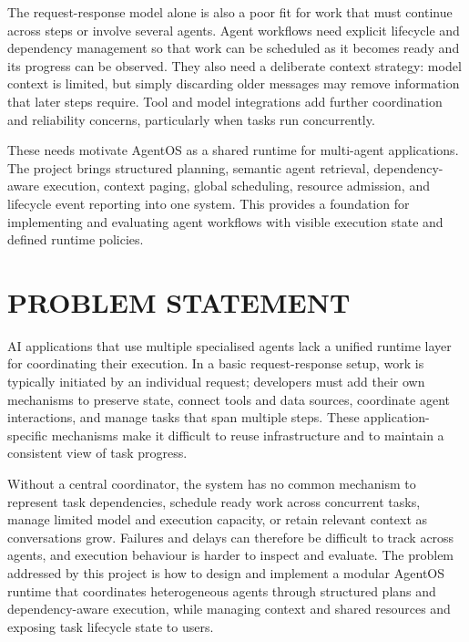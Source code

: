 The request-response model alone is also a poor fit for work that must continue across steps or involve several agents. Agent workflows need explicit lifecycle and dependency management so that work can be scheduled as it becomes ready and its progress can be observed. They also need a deliberate context strategy: model context is limited, but simply discarding older messages may remove information that later steps require. Tool and model integrations add further coordination and reliability concerns, particularly when tasks run concurrently.

These needs motivate AgentOS as a shared runtime for multi-agent applications. The project brings structured planning, semantic agent retrieval, dependency-aware execution, context paging, global scheduling, resource admission, and lifecycle event reporting into one system. This provides a foundation for implementing and evaluating agent workflows with visible execution state and defined runtime policies.

\section{\uppercase{Problem Statement}}
AI applications that use multiple specialised agents lack a unified runtime layer for coordinating their execution. In a basic request-response setup, work is typically initiated by an individual request; developers must add their own mechanisms to preserve state, connect tools and data sources, coordinate agent interactions, and manage tasks that span multiple steps. These application-specific mechanisms make it difficult to reuse infrastructure and to maintain a consistent view of task progress.

Without a central coordinator, the system has no common mechanism to represent task dependencies, schedule ready work across concurrent tasks, manage limited model and execution capacity, or retain relevant context as conversations grow. Failures and delays can therefore be difficult to track across agents, and execution behaviour is harder to inspect and evaluate. The problem addressed by this project is how to design and implement a modular AgentOS runtime that coordinates heterogeneous agents through structured plans and dependency-aware execution, while managing context and shared resources and exposing task lifecycle state to users.

